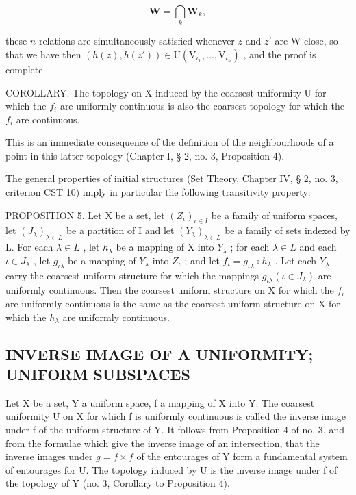 \[
\mathbf {W} = \bigcap_ {k} \mathbf {W} _ {k},
\]

these \(n\) relations are simultaneously satisfied whenever \(z\) and \(z'\) are W-close, so that we have then \((h(z), h(z')) \in \mathrm{U}(\mathrm{V}_{\iota_1}, \ldots, \mathrm{V}_{\iota_n})\) , and the proof is complete.

COROLLARY. The topology on X induced by the coarsest uniformity U for which the \(f_{i}\) are uniformly continuous is also the coarsest topology for which the \(f_{i}\) are continuous.

This is an immediate consequence of the definition of the neighbourhoods of a point in this latter topology (Chapter I, § 2, no. 3, Proposition 4).

The general properties of initial structures (Set Theory, Chapter IV, § 2, no. 3, criterion CST 10) imply in particular the following transitivity property:

PROPOSITION 5. Let X be a set, let \((Z_{\iota})_{\iota \in I}\) be a family of uniform spaces, let \((J_{\lambda})_{\lambda \in L}\) be a partition of I and let \((Y_{\lambda})_{\lambda \in L}\) be a family of sets indexed by L. For each \(\lambda \in L\) , let \(h_{\lambda}\) be a mapping of X into \(Y_{\lambda}\) ; for each \(\lambda \in L\) and each \(\iota \in J_{\lambda}\) , let \(g_{\iota \lambda}\) be a mapping of \(Y_{\lambda}\) into \(Z_{\iota}\) ; and let \(f_{\iota} = g_{\iota \lambda} \circ h_{\lambda}\) . Let each \(Y_{\lambda}\) carry the coarsest uniform structure for which the mappings \(g_{\iota \lambda} (\iota \in J_{\lambda})\) are uniformly continuous. Then the coarsest uniform structure on X for which the \(f_{\iota}\) are uniformly continuous is the same as the coarsest uniform structure on X for which the \(h_{\lambda}\) are uniformly continuous.

\subsection{INVERSE IMAGE OF A UNIFORMITY; UNIFORM SUBSPACES}

Let X be a set, Y a uniform space, f a mapping of X into Y. The coarsest uniformity U on X for which f is uniformly continuous is called the inverse image under f of the uniform structure of Y. It follows from Proposition 4 of no. 3, and from the formulae which give the inverse image of an intersection, that the inverse images under \(g = f \times f\) of the entourages of Y form a fundamental system of entourages for U. The topology induced by U is the inverse image under f of the topology of Y (no. 3, Corollary to Proposition 4).

